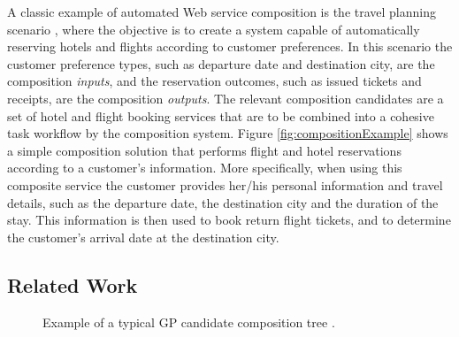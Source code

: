 \documentclass{article}
\begin{document}
A classic example of automated Web service composition is the travel planning scenario \cite{srivastava2003web}, where the objective is to create a system capable of
automatically reserving hotels and flights according to customer preferences. In this scenario the customer preference types, such as departure date and destination
city, are the composition \textit{inputs}, and the reservation outcomes, such as issued tickets and receipts, are the composition \textit{outputs}. The relevant composition
candidates are a set of hotel and flight booking services that are to be combined into a cohesive task workflow by the composition system. Figure \ref{fig:compositionExample} shows a simple composition solution that performs flight and hotel reservations according to a customer's information. More specifically, when using this composite service 
the customer provides her/his personal information and travel details, such as the departure date, the destination city and the duration of the stay. This information is
then used to book return flight tickets, and to determine the customer's arrival date at the destination city.

\subsection{Related Work}

\begin{figure}
\centerline{
}
\caption{Example of a typical GP candidate composition tree \protect\cite{aversano2006genetic}.}
\label{fig:treeExample}
\end{figure}
\end{document}
